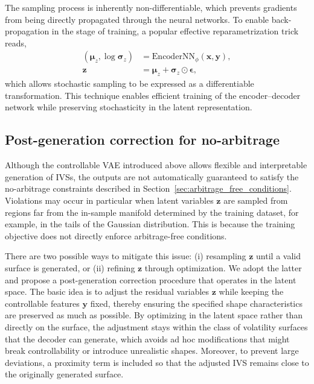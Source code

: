 \documentclass{article}
\begin{document}
The sampling process is inherently non-differentiable, which prevents gradients from being directly propagated through the neural networks. To enable back-propagation in the stage of training,  a popular effective reparametrization trick reads,
\begin{align}
(\boldsymbol{\mu}_z, \log \boldsymbol{\sigma}_z) &= \mathrm{EncoderNN}_{\phi}(\mathbf{x}, \mathbf{y}), \\
\mathbf{z} &= \boldsymbol{\mu}_z + \boldsymbol{\sigma}_z \odot \boldsymbol{\epsilon},
\end{align}
which allows stochastic sampling to be expressed as a differentiable transformation. This technique enables efficient training of the encoder–decoder network while preserving stochasticity in the latent representation.






\subsection{Post-generation correction for no-arbitrage}\label{sec:repair_method}


Although the controllable VAE introduced above allows flexible and interpretable 
generation of IVSs, the outputs are not automatically guaranteed to satisfy the 
 no-arbitrage constraints described in Section~\ref{sec:arbitrage_free_conditions}. 
Violations may occur in particular when latent variables $\mathbf{z}$ are sampled from 
regions far from the in-sample manifold  determined by the training dataset, for example,  in the tails of the Gaussian 
distribution. This is because the training objective does not directly 
enforce arbitrage-free conditions.

There are two possible ways to mitigate this issue: (i) resampling $\mathbf{z}$ until a valid surface is generated, or (ii) refining $\mathbf{z}$ through optimization. We adopt the latter and propose a post-generation correction procedure that operates in the latent space. The basic idea is to adjust the residual variables $\mathbf{z}$ while keeping the controllable features $\mathbf{y}$ fixed, thereby ensuring the specified shape characteristics are preserved as much as possible. By optimizing in the latent space rather than directly on the surface, the adjustment stays within the class of volatility surfaces that the decoder can generate, which avoids ad hoc modifications that might break controllability or introduce unrealistic shapes. Moreover, to prevent large deviations, a proximity term is included so that the adjusted IVS remains close to the originally generated surface. 
\end{document}
